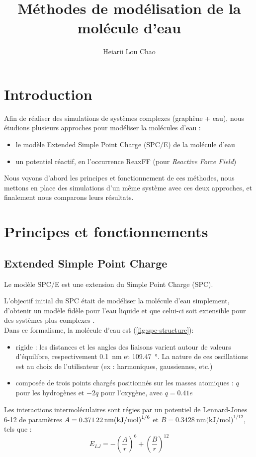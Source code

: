 \documentclass[11pt, a4paper]{article}
\title{Méthodes de modélisation de la molécule d'eau}
\author{Heiarii Lou Chao}
\begin{document}
\maketitle
\tableofcontents

\clearpage
\section*{Introduction}

Afin de réaliser des simulations de systèmes complexes (graphène + eau), nous étudions plusieurs approches pour modéliser la molécules d'eau :
\begin{itemize}
	\item le modèle Extended Simple Point Charge (SPC/E) de la molécule d'eau
	\item un potentiel réactif, en l'occurrence ReaxFF (pour \emph{Reactive Force Field})
\end{itemize}

Nous voyons d'abord les principes et fonctionnement de ces méthodes, nous mettons en place des simulations d'un même système avec ces deux approches, et finalement nous comparons leurs résultats.

\section{Principes et fonctionnements}

	\subsection{Extended Simple Point Charge}

Le modèle SPC/E est une extension du Simple Point Charge (SPC).

L'objectif initial du SPC était de modéliser la molécule d'eau simplement, d'obtenir un modèle fidèle pour l'eau liquide et que celui-ci soit extensible pour des systèmes plus complexes \cite{pullman_interaction_1981}.\\
Dans ce formalisme, la molécule d'eau est (\autoref{fig:spc-structure}):
\begin{itemize}
	\item rigide : les distances  et les angles des liaisons varient autour de valeurs d'équilibre, respectivement \qty{0.1}{\nano\meter} et \qty{109.47}{\degree}. La nature de ces oscillations est au choix de l'utilisateur (ex : harmoniques, gaussiennes, etc.)
	\item composée de trois points chargés positionnés sur les masses atomiques : $q$ pour les hydrogènes et $-2 q$ pour l'oxygène, avec $q = 0.41 e$
\end{itemize}
Les interactions intermoléculaires sont régies par un potentiel de Lennard-Jones 6-12 de paramètres $A = \qty{0.37122}{\nano\meter (\kilo\joule\per\mole)\tothe{1/6}}$ et $B = \qty{0.3428}{\nano\meter (\kilo\joule\per\mole)^{1/12}}$, tels que :
\begin{equation*}
	E_{LJ} = -\left( \frac{A}{r} \right)^6 + \left( \frac{B}{r} \right)^{12}
\end{equation*}
\end{document}
